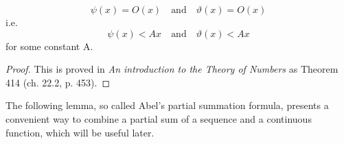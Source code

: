 \documentclass{article}
\begin{document}
\begin{lemma}
\label{lemma:cheb}
\begin{equation*}
    \psi(x) = O(x) \quad\text{and}\quad \vartheta(x)=O(x)
\end{equation*}
i.e.
\begin{equation*}
    \psi(x) < Ax \quad\text{and}\quad \vartheta(x) < Ax
\end{equation*}
for some constant A.
\begin{proof}
This is proved in \textit{An introduction to the Theory of Numbers} \cite{HardyWright} as Theorem 414 (ch. 22.2, p. 453).
\end{proof}
\end{lemma}

The following lemma, so called Abel's partial summation formula, presents a convenient way to combine a partial sum of a sequence and a continuous function, which will be useful later.
\end{document}
